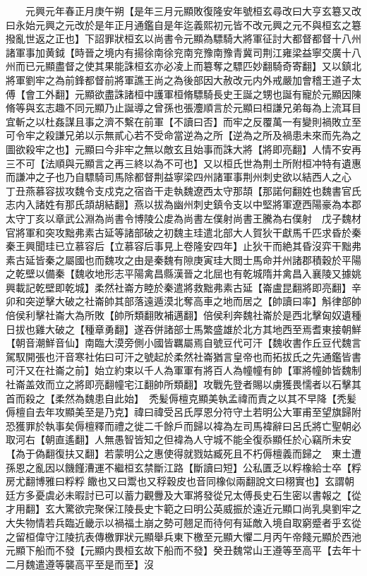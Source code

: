 　　元興元年春正月庚午朔【是年三月元顯敗復隆安年號桓玄尋改曰大亨玄簒又改曰永始元興之元改於是年正月通鑑自是年迄義熙初元皆不改元興之元不與桓玄之簒撥亂世返之正也】下詔罪狀桓玄以尚書令元顯為驃騎大將軍征討大都督都督十八州諸軍事加黄鉞【時晉之境内有揚徐南徐兖南兖豫南豫青冀司荆江雍梁益寧交廣十八州而已元顯盡督之使其果能誅桓玄亦必凌上而簒奪之驃匹妙翻騎奇寄翻】又以鎮北將軍劉牢之為前鋒都督前將軍譙王尚之為後部因大赦改元内外戒嚴加會稽王道子太傅【會工外翻】元顯欲盡誅諸桓中護軍桓脩驃騎長史王誕之甥也誕有寵於元顯因陳脩等與玄志趣不同元顯乃止誕導之曾孫也張灋順言於元顯曰桓謙兄弟每為上流耳目宜斬之以杜姦謀且事之濟不繫在前軍【不讀曰否】而牢之反覆萬一有變則禍敗立至可令牢之殺謙兄弟以示無貳心若不受命當逆為之所【逆為之所及禍患未來而先為之圖欲殺牢之也】元顯曰今非牢之無以敵玄且始事而誅大將【將即亮翻】人情不安再三不可【法順與元顯言之再三終以為不可也】又以桓氏世為荆土所附桓冲特有遺惠而謙冲之子也乃自驃騎司馬除都督荆益寧梁四州諸軍事荆州刺史欲以結西人之心　丁丑燕慕容拔攻魏令支戍克之宿沓干走執魏遼西太守那頡【那諾何翻姓也魏書官氏志内入諸姓有那氏頡胡結翻】燕以拔為幽州刺史鎮令支以中堅將軍遼西陽豪為本郡太守丁亥以章武公淵為尚書令博陵公䖍為尚書左僕射尚書王騰為右僕射　戊子魏材官將軍和突攻黜弗素古延等諸部破之初魏主珪遣北部大人賀狄干獻馬千匹求昏於秦秦王興聞珪已立慕容后【立慕容后事見上卷隆安四年】止狄干而絶其昏沒弈干黜弗素古延皆秦之屬國也而魏攻之由是秦魏有隙庚寅珪大閲士馬命并州諸郡積穀於平陽之乾壁以備秦【魏收地形志平陽禽昌縣漢晉之北屈也有乾城隋并禽昌入襄陵又據姚興載記乾壁即乾城】柔然社崙方睦於秦遣將救黜弗素古延【崙盧昆翻將即亮翻】辛卯和突逆擊大破之社崙帥其部落遠遁漠北奪高車之地而居之【帥讀曰率】斛律部帥倍侯利擊社崙大為所敗【帥所類翻敗補邁翻】倍侯利奔魏社崙於是西北擊匈奴遺種日拔也雞大破之【種章勇翻】遂吞併諸部士馬繁盛雄於北方其地西至焉耆東接朝鮮【朝音潮鮮音仙】南臨大漠旁側小國皆羈屬焉自號豆代可汗【魏收書作丘豆代魏言駕馭開張也汗音寒社佑曰可汗之號起於柔然社崙猶言皇帝也而拓拔氏之先通鑑皆書可汗又在社崙之前】始立約束以千人為軍軍有將百人為幢幢有帥【軍將幢帥皆魏制社崙盖效而立之將即亮翻幢宅江翻帥所類翻】攻戰先登者賜以虜獲畏懦者以石擊其首而殺之【柔然為魏患自此始】　秃髪傉檀克顯美執孟禕而責之以其不早降【秃髪傉檀自去年攻顯美至是乃克】禕曰禕受呂氏厚恩分符守土若明公大軍甫至望旗歸附恐獲罪於執事矣傉檀釋而禮之徙二千餘戶而歸以褘為左司馬褘辭曰呂氏將亡聖朝必取河右【朝直遙翻】人無愚智皆知之但褘為人守城不能全復忝顯任於心竊所未安【為于偽翻復扶又翻】若蒙明公之惠使得就戮姑臧死且不朽傉檀義而歸之　東土遭孫恩之亂因以饑饉漕運不繼桓玄禁斷江路【斷讀曰短】公私匱乏以粰橡給士卒【粰房尤翻博雅曰粰粰饊也又曰鬻也又稃穀皮也音同橡似兩翻說文曰栩實也】玄謂朝廷方多憂虞必未暇討已可以蓄力觀釁及大軍將發從兄太傅長史石生密以書報之【從才用翻】玄大驚欲完聚保江陵長史卞範之曰明公英威振於遠近元顯口尚乳臭劉牢之大失物情若兵臨近畿示以禍福土崩之勢可翹足而待何有延敵入境自取窮蹙者乎玄從之留桓偉守江陵抗表傳檄罪狀元顯舉兵東下檄至元顯大懼二月丙午帝餞元顯於西池元顯下船而不發【元顯内畏桓玄故下船而不發】癸丑魏常山王遵等至高平【去年十二月魏遣遵等襲高平至是而至】沒

